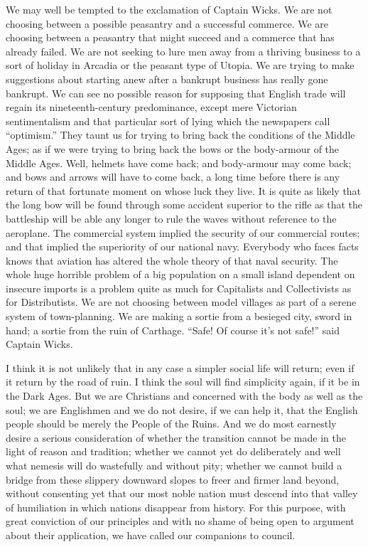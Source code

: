 \documentclass{book}
\begin{document}
We may well be tempted to the exclamation of Captain Wicks. We are not choosing between a possible peasantry and a successful commerce. We are choosing between a peasantry that might succeed and a commerce that has already failed. We are not seeking to lure men away from a thriving business to a sort of holiday in Arcadia or the peasant type of Utopia. We are trying to make suggestions about starting anew after a bankrupt business has really gone bankrupt. We can see no possible reason for supposing that English trade will regain its nineteenth-century predominance, except mere Victorian sentimentalism and that particular sort of lying which the newspapers call “optimism.” They taunt us for trying to bring back the conditions of the Middle Ages; as if we were trying to bring back the bows or the body-armour of the Middle Ages. Well, helmets have come back; and body-armour may come back; and bows and arrows will have to come back, a long time before there is any return of that fortunate moment on whose luck they live. It is quite as likely that the long bow will be found through some accident superior to the rifle as that the battleship will be able any longer to rule the waves without reference to the aeroplane. The commercial system implied the security of our commercial routes; and that implied the superiority of our national navy. Everybody who faces facts knows that aviation has altered the whole theory of that naval security. The whole huge horrible problem of a big population on a small island dependent on insecure imports is a problem quite as much for Capitalists and Collectivists as for Distributists. We are not choosing between model villages as part of a serene system of town-planning. We are making a sortie from a besieged city, sword in hand; a sortie from the ruin of Carthage. “Safe! Of course it’s not safe!” said Captain Wicks.

I think it is not unlikely that in any case a simpler social life will return; even if it return by the road of ruin. I think the soul will find simplicity again, if it be in the Dark Ages. But we are Christians and concerned with the body as well as the soul; we are Englishmen and we do not desire, if we can help it, that the English people should be merely the People of the Ruins. And we do most earnestly desire a serious consideration of whether the transition cannot be made in the light of reason and tradition; whether we cannot yet do deliberately and well what nemesis will do wastefully and without pity; whether we cannot build a bridge from these slippery downward slopes to freer and firmer land beyond, without consenting yet that our most noble nation must descend into that valley of humiliation in which nations disappear from history. For this purpose, with great conviction of our principles and with no shame of being open to argument about their application, we have called our companions to council.
\end{document}
